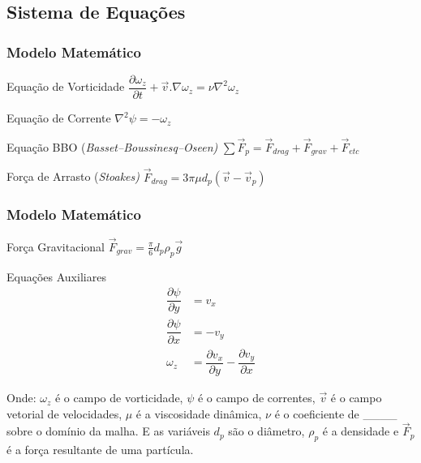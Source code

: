 \documentclass{beamer}
\newcommand{\partfrac}[3] %
{
  \ensuremath{\dfrac{\partial{#2}}{\partial{#3}}}
}
\begin{document}
\subsection{Sistema de Equações}
\begin{frame}
  \frametitle{Modelo Matemático}
  \begin{block}{Equação de Vorticidade}
    \centering
    $\partfrac2{\omega_z}{t} + \vec{v}.\nabla\omega_z = \nu \nabla^2 \omega_z$
  \end{block}

  \begin{block}{Equação de Corrente}
    \centering
    $\nabla^2 \psi = -\omega_z$
  \end{block}
  
  \begin{block}{Equação BBO (\it{Basset–Boussinesq–Oseen})}
    \centering
    $\sum \vec{F}_p = \vec{F}_{drag} + \vec{F}_{grav} + \vec{F}_{etc}$
  \end{block}
  
  \begin{block}{Força de Arrasto (\it{Stoakes})}
    \centering
    $\vec{F}_{drag} = 3 \pi \mu d_p (\vec{v} - \vec{v}_p)$
  \end{block}
  
\end{frame}

\begin{frame}
  \frametitle{Modelo Matemático}
  \begin{block}{Força Gravitacional}
    \centering
    $\vec{F}_{grav} = \tfrac{\pi}{6} d_p \rho_p \vec{g}$
  \end{block}
  
  \begin{block}{Equações Auxiliares}
    \vspace*{-\baselineskip}\setlength\belowdisplayshortskip{0pt} %
    \centering
    \begin{align*}
      \partfrac2{\psi}{y} &= v_x \\
      \partfrac2{\psi}{x} &= -v_y \\
      \omega_z &= \partfrac2{v_x}{y} - \partfrac2{v_y}{x} 
    \end{align*}
  \end{block}
  
  \footnotesize{
    Onde: $\omega_z$ é o campo de vorticidade, $\psi$ é o campo de correntes, $\vec{v}$ é o campo vetorial de velocidades, 
    $\mu$ é a viscosidade dinâmica, $\nu$ é o coeficiente de \_\_\_\_ sobre o domínio da malha.
    E as variáveis $d_p$ são o diâmetro, $\rho_p$ é a densidade e $\vec{F}_p$ é a força resultante de uma partícula.
  }
  
\end{frame}
\end{document}
